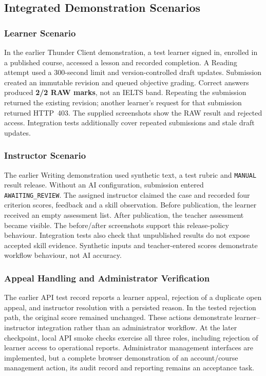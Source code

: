 \subsection{Integrated Demonstration Scenarios}

\subsubsection{Learner Scenario}
In the earlier Thunder Client demonstration, a test learner signed in,
enrolled in a published course, accessed a lesson and recorded completion.
A Reading attempt used a 300-second limit and version-controlled draft
updates. Submission created an immutable revision and queued objective
grading. Correct answers produced \textbf{2/2 RAW marks}, not an IELTS band.
Repeating the submission returned the existing revision; another learner's
request for that submission returned HTTP~403. The supplied screenshots
show the RAW result and rejected access. Integration tests additionally
cover repeated submissions and stale draft updates.


\subsubsection{Instructor Scenario}
The earlier Writing demonstration used synthetic text, a test rubric and
\texttt{MANUAL} result release. Without an AI configuration, submission
entered \texttt{AWAITING\_REVIEW}. The assigned instructor claimed the case
and recorded four criterion scores, feedback and a skill observation.
Before publication, the learner received an empty assessment list. After
publication, the teacher assessment became visible. The before/after
screenshots support this release-policy behaviour. Integration tests also
check that unpublished results do not expose accepted skill evidence.
Synthetic inputs and teacher-entered scores demonstrate workflow behaviour,
not AI accuracy.


\subsubsection{Appeal Handling and Administrator Verification}
The earlier API test record reports a learner appeal, rejection of a
duplicate open appeal, and instructor resolution with a persisted reason.
In the tested rejection path, the original score remained unchanged.
These actions demonstrate learner--instructor integration rather than an
administrator workflow. At the later checkpoint, local API smoke checks
exercise all three roles, including rejection of learner access to
operational reports. Administrator management interfaces are implemented,
but a complete browser demonstration of an account/course management action,
its audit record and reporting remains an acceptance task.

